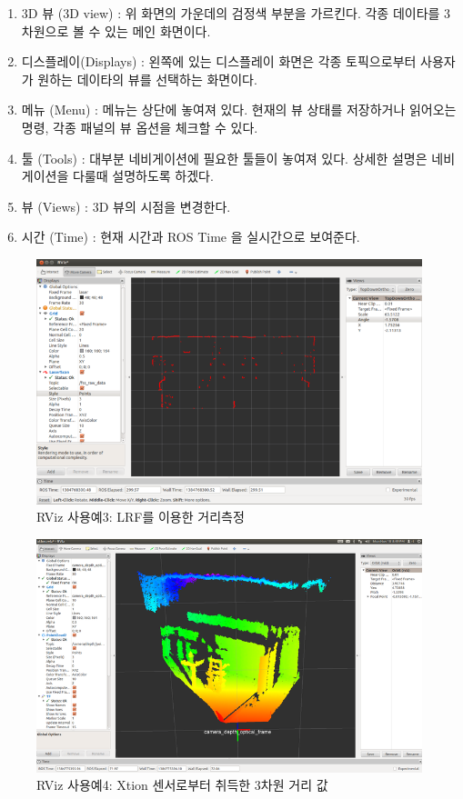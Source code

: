 \begin{enumerate}[leftmargin=*, label=\arabic{*})]
\item 3D 뷰 (3D view)
: 위 화면의 가운데의 검정색 부분을 가르킨다. 각종 데이타를 3차원으로 볼 수 있는 메인 화면이다.

\item 디스플레이(Displays) 
: 왼쪽에 있는 디스플레이 화면은 각종 토픽으로부터 사용자가 원하는 데이타의 뷰를 선택하는 화면이다.

\item 메뉴 (Menu)
: 메뉴는 상단에 놓여져 있다. 현재의 뷰 상태를 저장하거나 읽어오는 명령, 각종 패널의 뷰 옵션을 체크할 수 있다.

\item 툴 (Tools)
: 대부분 네비게이션에 필요한 툴들이 놓여져 있다. 상세한 설명은 네비게이션을 다룰때 설명하도록 하겠다.

\item 뷰 (Views)
: 3D 뷰의 시점을 변경한다.

\item 시간 (Time)
: 현재 시간과 ROS Time 을 실시간으로 보여준다.
\end{enumerate}

\begin{figure}[h]
\centering\includegraphics[width=0.6\columnwidth]{pictures/chapter6/rviz_example3.png}
\caption{RViz 사용예3: LRF를 이용한 거리측정}
\end{figure}

\begin{figure}[h]
\centering\includegraphics[width=0.6\columnwidth]{pictures/chapter6/rviz_example4.png}
\caption{RViz 사용예4: Xtion 센서로부터 취득한 3차원 거리 값}
\end{figure}

